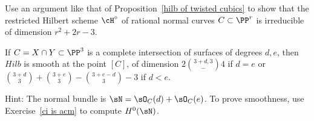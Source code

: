 \begin{exercise}\label{rational normal hilbert}
Use an  argument like that of Proposition~\ref{hilb of twisted cubics} to show that the restricted Hilbert scheme $\cH^\circ$ of rational normal curves $C \subset \PP^r$ is irreducible of dimension $r^2+2r-3$.
\end{exercise}

\begin{exercise}\label{hilb at a ci}
If $C = X\cap Y\subset \PP^3$ is a complete intersection of surfaces of degrees $d,e$, then
$Hilb$ is smooth at the point $[C]$, of dimension $2\binom{3+d,3}-4$ if $d=e$
or $\binom{3+d}{3} +\binom{3+e}{3} -\binom{3+e-d}{3} -3$ if $d<e$.

Hint: The normal bundle is $\sN = \sO_C(d)+\sO_C(e)$. To prove smoothness, use
Exercise~\ref{ci is acm} to compute $H^0(\sN)$.
\end{exercise}

%

